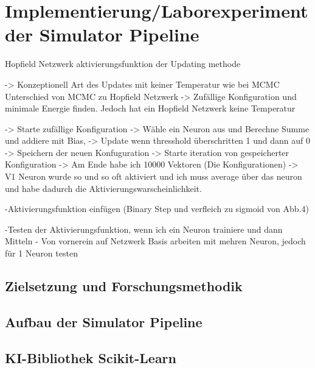 \chapter{Implementierung/Laborexperiment der Simulator Pipeline}

Hopfield Netzwerk aktivierungsfunktion der Updating methode

-> Konzeptionell Art des Updates mit keiner Temperatur wie bei MCMC 
Unterschied von MCMC zu Hopfield Netzwerk -> Zufällige Konfiguration und minimale Energie finden. Jedoch hat ein Hopfield
Netzwerk keine Temperatur 

-> Starte zufällige Konfiguration
-> Wähle ein Neuron aus und Berechne Summe und addiere mit Bias, 
-> Update wenn thresshold überschritten 1 und dann auf 0 
-> Speichern der neuen Konfuguration 
-> Starte iteration von gespeicherter Konfiguration 
-> Am Ende habe ich 10000 Vektoren (Die Konfigurationen) -> V1 Neuron wurde so und so oft aktiviert und ich muss average
über das neuron und habe dadurch die Aktivierungswarscheinlichkeit.

-Aktivierungsfunktion einfügen (Binary Step und verfleich zu sigmoid von Abb.4)


-Testen der Aktivierungsfunktion, wenn ich ein Neuron trainiere und dann Mitteln 
- Von vornerein auf Netzwerk Basis arbeiten mit mehren Neuron, jedoch für 1 Neuron testen




\section{Zielsetzung und Forschungsmethodik}
\section{Aufbau der Simulator Pipeline}
\section{KI-Bibliothek Scikit-Learn}
